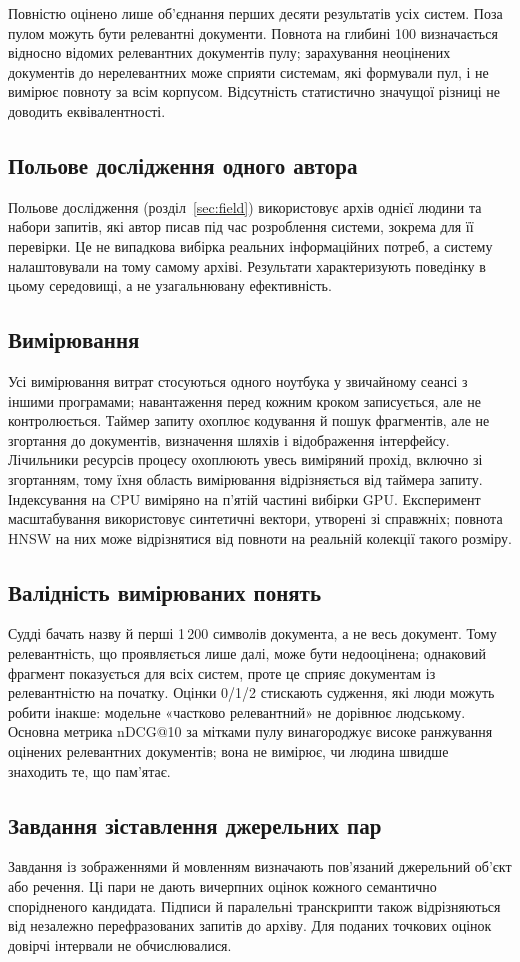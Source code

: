 Повністю оцінено лише об'єднання перших десяти результатів усіх систем. Поза пулом можуть бути релевантні документи. Повнота на глибині 100 визначається відносно відомих релевантних документів пулу; зарахування неоцінених документів до нерелевантних може сприяти системам, які формували пул, і не вимірює повноту за всім корпусом. Відсутність статистично значущої різниці не доводить еквівалентності.

\subsection{Польове дослідження одного автора}
Польове дослідження (розділ~\ref{sec:field}) використовує архів однієї людини та набори запитів, які автор писав під час розроблення системи, зокрема для її перевірки. Це не випадкова вибірка реальних інформаційних потреб, а систему налаштовували на тому самому архіві. Результати характеризують поведінку в цьому середовищі, а не узагальнювану ефективність.

\subsection{Вимірювання}
Усі вимірювання витрат стосуються одного ноутбука у звичайному сеансі з іншими програмами; навантаження перед кожним кроком записується, але не контролюється. Таймер запиту охоплює кодування й пошук фрагментів, але не згортання до документів, визначення шляхів і відображення інтерфейсу. Лічильники ресурсів процесу охоплюють увесь виміряний прохід, включно зі згортанням, тому їхня область вимірювання відрізняється від таймера запиту. Індексування на CPU виміряно на п'ятій частині вибірки GPU. Експеримент масштабування використовує синтетичні вектори, утворені зі справжніх; повнота HNSW на них може відрізнятися від повноти на реальній колекції такого розміру.

\subsection{Валідність вимірюваних понять}
Судді бачать назву й перші 1\,200 символів документа, а не весь документ. Тому релевантність, що проявляється лише далі, може бути недооцінена; однаковий фрагмент показується для всіх систем, проте це сприяє документам із релевантністю на початку. Оцінки 0/1/2 стискають судження, які люди можуть робити інакше: модельне «частково релевантний» не дорівнює людському. Основна метрика nDCG@10 за мітками пулу винагороджує високе ранжування оцінених релевантних документів; вона не вимірює, чи людина швидше знаходить те, що пам'ятає.

\subsection{Завдання зіставлення джерельних пар}
Завдання із зображеннями й мовленням визначають пов'язаний джерельний об'єкт або речення. Ці пари не дають вичерпних оцінок кожного семантично спорідненого кандидата. Підписи й паралельні транскрипти також відрізняються від незалежно перефразованих запитів до архіву. Для поданих точкових оцінок довірчі інтервали не обчислювалися.
